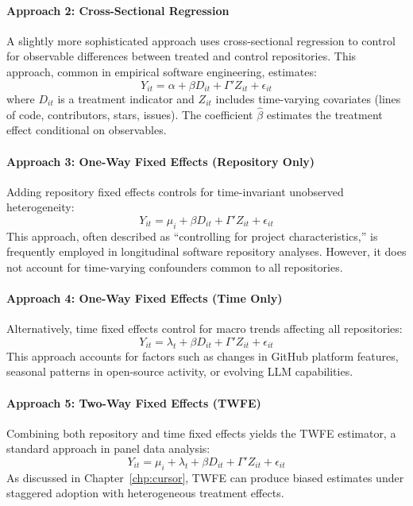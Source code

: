 \paragraph{Approach 2: Cross-Sectional Regression}
A slightly more sophisticated approach uses cross-sectional regression to control for observable differences between treated and control repositories.
This approach, common in empirical software engineering, estimates:
\begin{equation}
Y_{it} = \alpha + \beta D_{it} + \Gamma' Z_{it} + \epsilon_{it}
\end{equation}
where $D_{it}$ is a treatment indicator and $Z_{it}$ includes time-varying covariates (lines of code, contributors, stars, issues).
The coefficient $\hat{\beta}$ estimates the treatment effect conditional on observables.

\paragraph{Approach 3: One-Way Fixed Effects (Repository Only)}
Adding repository fixed effects controls for time-invariant unobserved heterogeneity:
\begin{equation}
Y_{it} = \mu_i + \beta D_{it} + \Gamma' Z_{it} + \epsilon_{it}
\end{equation}
This approach, often described as ``controlling for project characteristics,'' is frequently employed in longitudinal software repository analyses.
However, it does not account for time-varying confounders common to all repositories.

\paragraph{Approach 4: One-Way Fixed Effects (Time Only)}
Alternatively, time fixed effects control for macro trends affecting all repositories:
\begin{equation}
Y_{it} = \lambda_t + \beta D_{it} + \Gamma' Z_{it} + \epsilon_{it}
\end{equation}
This approach accounts for factors such as changes in GitHub platform features, seasonal patterns in open-source activity, or evolving LLM capabilities.

\paragraph{Approach 5: Two-Way Fixed Effects (TWFE)}
Combining both repository and time fixed effects yields the TWFE estimator, a standard approach in panel data analysis:
\begin{equation}
Y_{it} = \mu_i + \lambda_t + \beta D_{it} + \Gamma' Z_{it} + \epsilon_{it}
\end{equation}
As discussed in Chapter~\ref{chp:cursor}, TWFE can produce biased estimates under staggered adoption with heterogeneous treatment effects.

